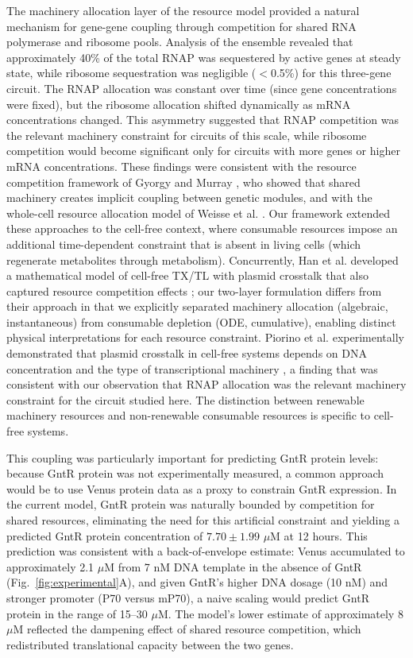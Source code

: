 \documentclass[12pt]{article}
\begin{document}
The machinery allocation layer of the resource model provided a natural mechanism for gene-gene coupling through competition for shared RNA polymerase and ribosome pools. Analysis of the ensemble revealed that approximately 40\% of the total RNAP was sequestered by active genes at steady state, while ribosome sequestration was negligible ($<$0.5\%) for this three-gene circuit. The RNAP allocation was constant over time (since gene concentrations were fixed), but the ribosome allocation shifted dynamically as mRNA concentrations changed. This asymmetry suggested that RNAP competition was the relevant machinery constraint for circuits of this scale, while ribosome competition would become significant only for circuits with more genes or higher mRNA concentrations. These findings were consistent with the resource competition framework of Gyorgy and Murray \cite{gyorgy2016resource}, who showed that shared machinery creates implicit coupling between genetic modules, and with the whole-cell resource allocation model of Weisse et al. \cite{weisse2015mechanistic}. Our framework extended these approaches to the cell-free context, where consumable resources impose an additional time-dependent constraint that is absent in living cells (which regenerate metabolites through metabolism). Concurrently, Han et al. developed a mathematical model of cell-free TX/TL with plasmid crosstalk that also captured resource competition effects \cite{han2025mathematical}; our two-layer formulation differs from their approach in that we explicitly separated machinery allocation (algebraic, instantaneous) from consumable depletion (ODE, cumulative), enabling distinct physical interpretations for each resource constraint. Piorino et al. experimentally demonstrated that plasmid crosstalk in cell-free systems depends on DNA concentration and the type of transcriptional machinery \cite{piorino2023plasmid}, a finding that was consistent with our observation that RNAP allocation was the relevant machinery constraint for the circuit studied here. The distinction between renewable machinery resources and non-renewable consumable resources is specific to cell-free systems.

This coupling was particularly important for predicting GntR protein levels: because GntR protein was not experimentally measured, a common approach would be to use Venus protein data as a proxy to constrain GntR expression. In the current model, GntR protein was naturally bounded by competition for shared resources, eliminating the need for this artificial constraint and yielding a predicted GntR protein concentration of $7.70 \pm 1.99$ $\mu$M at 12 hours. This prediction was consistent with a back-of-envelope estimate: Venus accumulated to approximately 2.1 $\mu$M from 7 nM DNA template in the absence of GntR (Fig.~\ref{fig:experimental}A), and given GntR's higher DNA dosage (10 nM) and stronger promoter (P70 versus mP70), a naive scaling would predict GntR protein in the range of 15--30 $\mu$M. The model's lower estimate of approximately 8 $\mu$M reflected the dampening effect of shared resource competition, which redistributed translational capacity between the two genes.
\end{document}
